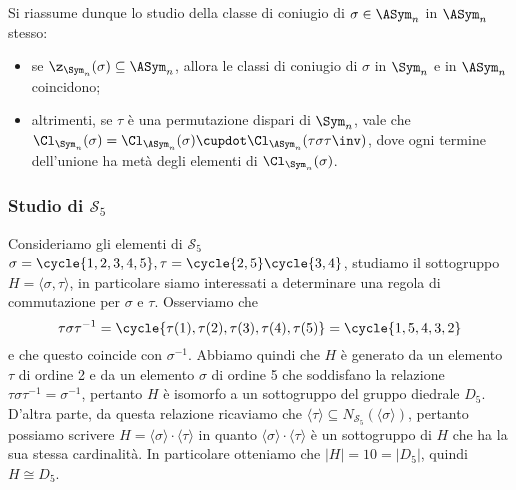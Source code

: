 \documentclass[11pt]{scrartcl}
\begin{document}
	
	Si riassume dunque lo studio della classe di coniugio di $\sigma \in \ASym_n$ in $\ASym_n$ stesso:
	\begin{itemize}
		\item se $\z_{\Sym_n}(\sigma) \subseteq \ASym_n$, allora le classi di coniugio di
		$\sigma$ in $\Sym_n$ e in $\ASym_n$ coincidono;
		\item altrimenti, se $\tau$ è una permutazione dispari di $\Sym_n$, vale
		che $\Cl_{\Sym_n}(\sigma) = \Cl_{\ASym_n}(\sigma) \cupdot \Cl_{\ASym_n}(\tau\sigma\tau\inv)$, dove ogni termine dell'unione ha metà degli
		elementi di $\Cl_{\Sym_n}(\sigma)$.
		
	\end{itemize}
	
	\subsubsection{Studio di $\mathcal{S}_5$}
	
	Consideriamo gli elementi di $\mathcal{S}_5$ $\sigma = \cycle{1, 2, 3, 4, 5}, 
	\tau = \cycle{2, 5}\cycle{3, 4}$, studiamo il sottogruppo $H = \langle\sigma, \tau\rangle$,
	in particolare siamo interessati a determinare una regola di commutazione
	per $\sigma$ e $\tau$. Osserviamo che 
	\[
	\tau\sigma\tau^{-1} = \cycle{\tau(1), \tau(2), \tau(3), \tau(4), \tau(5)} = 
	\cycle{1, 5, 4, 3, 2}
	\]
	e che questo coincide con $\sigma^{-1}$. Abbiamo quindi che $H$ è generato 
	da un elemento $\tau$ di ordine 2 e da un elemento $\sigma$ di ordine 5 
	che soddisfano la relazione $\tau\sigma\tau^{-1} = \sigma^{-1}$, pertanto 
	$H$ è isomorfo a un sottogruppo del gruppo diedrale $D_5$. D'altra parte, 
	da questa relazione ricaviamo che $\langle \tau\rangle \subseteq N_{\mathcal{S}_5}(\langle\sigma\rangle)$,
	pertanto possiamo scrivere $H = \langle\sigma\rangle\cdot\langle\tau\rangle$
	in quanto $\langle\sigma\rangle\cdot\langle\tau\rangle$ è un sottogruppo di $H$
	che ha la sua stessa cardinalità. In particolare otteniamo che $|H| = 10 = |D_5|$,
	quindi $H \cong D_5$.\\
	
	
\end{document}
